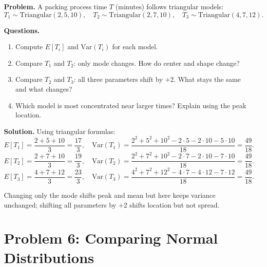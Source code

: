\textbf{Problem.}
A packing process time \(T\) (minutes) follows triangular models:
\[
T_1\sim \text{Triangular}(2,5,10),\quad
T_2\sim \text{Triangular}(2,7,10),\quad
T_3\sim \text{Triangular}(4,7,12).
\]

\textbf{Questions.}
\begin{enumerate}
  \item Compute \(E[T_i]\) and \(\mathrm{Var}(T_i)\) for each model.
  \item Compare \(T_1\) and \(T_2\): only mode changes. How do center and shape change?
  \item Compare \(T_2\) and \(T_3\): all three parameters shift by +2. What stays the same and what changes?
  \item Which model is most concentrated near larger times? Explain using the peak location.
\end{enumerate}

\textbf{Solution.}
Using triangular formulas:
\[
E[T_1]=\frac{2+5+10}{3}=\frac{17}{3},\quad
\mathrm{Var}(T_1)=\frac{2^2+5^2+10^2-2\cdot5-2\cdot10-5\cdot10}{18}=\frac{49}{18}.
\]
\[
E[T_2]=\frac{2+7+10}{3}=\frac{19}{3},\quad
\mathrm{Var}(T_2)=\frac{2^2+7^2+10^2-2\cdot7-2\cdot10-7\cdot10}{18}=\frac{49}{18}.
\]
\[
E[T_3]=\frac{4+7+12}{3}=\frac{23}{3},\quad
\mathrm{Var}(T_3)=\frac{4^2+7^2+12^2-4\cdot7-4\cdot12-7\cdot12}{18}=\frac{49}{18}.
\]
\begin{center}
\end{center}
Changing only the mode shifts peak and mean but here keeps variance unchanged; shifting all parameters by +2 shifts location but not spread.

\section{Problem 6: Comparing Normal Distributions}

